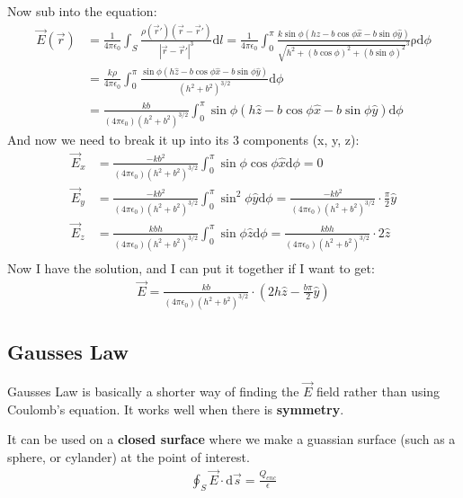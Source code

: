 \documentclass[12pt,letterpaper]{article} \usepackage{amsmath} \usepackage{graphicx} \usepackage[margin=1in]{geometry} \usepackage{longtable}  \usepackage{amssymb}
\begin{document}
\begin{mdframed}
		Now sub into the equation:
		\begin{align*}
			\vec E (\vec r) &= \frac{1}{4\pi \epsilon_0} \int_S \frac{\rho(\vec r\prime)(\vec r - \vec r\prime)}{|\vec r - \vec r\prime | ^3}\mathrm d l = \frac{1}{4\pi \epsilon_0} \int_0^\pi \frac{k\sin\phi(h\hat z - b\cos\phi\hat x - b\sin\phi\hat y)}{\sqrt{h^2 + (b\cos\phi)^2+(b\sin\phi)^2}  ^3}\mathrm \rho\mathrm d \phi \\
			&=\frac{k\rho}{4\pi \epsilon_0} \int_0^\pi \frac{\sin\phi(h\hat z - b\cos\phi\hat x - b\sin\phi\hat y)}{(h^2 + b^2)^{3/2}}\mathrm d \phi\\
			&=\frac{kb}{(4\pi \epsilon_0)(h^2 + b^2)^{3/2}} \int_0^\pi \sin\phi(h\hat z - b\cos\phi\hat x - b\sin\phi\hat y)\mathrm d \phi
		\end{align*}
		And now we need to break it up into its 3 components (x, y, z):
		\begin{align*}
			\vec E_x &= \frac{-kb^2}{(4\pi \epsilon_0)(h^2 + b^2)^{3/2}} \int_0^\pi \sin\phi\cos\phi\hat x\mathrm d \phi = 0\\
			\vec E_y &= \frac{-kb^2}{(4\pi \epsilon_0)(h^2 + b^2)^{3/2}} \int_0^\pi \sin^2\phi\hat y\mathrm d \phi = \frac{-kb^2}{(4\pi \epsilon_0)(h^2 + b^2)^{3/2}} \cdot \frac{\pi}{2}\hat y\\
			\vec E_z &= \frac{kbh}{(4\pi \epsilon_0)(h^2 + b^2)^{3/2}} \int_0^\pi \sin\phi\hat z\mathrm d \phi = \frac{kbh}{(4\pi \epsilon_0)(h^2 + b^2)^{3/2}} \cdot 2\hat z\\
		\end{align*}
		Now I have the solution, and I can put it together if I want to get:
		\begin{align*}
			\vec E = \frac{kb}{(4\pi \epsilon_0)(h^2 + b^2)^{3/2}} \cdot \left(2h\hat z - \frac{b\pi}{2}\hat y\right)
		\end{align*}
	\end{mdframed}
	
	\subsection{Gausses Law}
	Gausses Law is basically a shorter way of finding the $\vec E$ field rather than using Coulomb's equation. It works well when there is \textbf{symmetry}.
	
	It can be used on a \textbf{closed surface} where we make a guassian surface (such as a sphere, or cylander) at the point of interest. 
	\begin{align*}
		\oint_S \vec E \cdot \mathrm d \vec s = \frac{Q_{enc}}{\epsilon}
	\end{align*}
\end{document}
